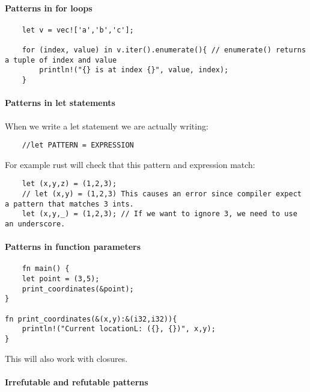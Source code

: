 \paragraph*{Patterns in for loops}\begin{lstlisting}
    let v = vec!['a','b','c'];

    for (index, value) in v.iter().enumerate(){ // enumerate() returns a tuple of index and value 
        println!("{} is at index {}", value, index);
    }
\end{lstlisting}

\paragraph*{Patterns in let statements}

When we write a let statement we are actually writing: \begin{lstlisting}
    //let PATTERN = EXPRESSION
\end{lstlisting}

For example rust will check that this pattern and expression match: \begin{lstlisting}
    let (x,y,z) = (1,2,3);
    // let (x,y) = (1,2,3) This causes an error since compiler expect a pattern that matches 3 ints.
    let (x,y,_) = (1,2,3); // If we want to ignore 3, we need to use an underscore.
\end{lstlisting}

\paragraph*{Patterns in function parameters}
\begin{lstlisting}
    fn main() {
    let point = (3,5);
    print_coordinates(&point);
}

fn print_coordinates(&(x,y):&(i32,i32)){
    println!("Current locationL: ({}, {})", x,y);
}
\end{lstlisting}
This will also work with closures.

\paragraph*{Irrefutable and refutable patterns}

